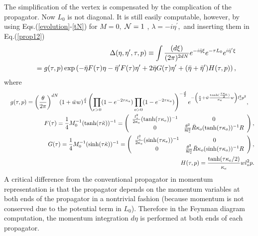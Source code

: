 \documentclass[a4paper,11pt]{article}
\begin{document}
The simplification of the vertex is compensated by the complication of the
propagator. Now $L_{0}$ is not diagonal. It is still easily computable,
however, by using Eqs.(\ref{evolution}-\ref{tN}) for $M=0,$ ${\cal N}=1$ , $\lambda
=-i\eta ^{\prime },$ and inserting them in Eq.(\ref{prop12})
\begin{eqnarray}
&&\Delta (\eta ,\eta ^{\prime },\tau ,p)\equiv \int \frac{(d\xi )}{(2\pi
)^{2dN}}e^{-i\bar{\eta}\xi }e^{-\tau L_{0}}e^{i\bar{\eta}^{\prime }\xi }
\label{propagator} \\
&&\quad =g(\tau ,p)\exp \left( -\bar{\eta}F(\tau )\eta -\bar{\eta}^{\prime
}F(\tau )\eta ^{\prime }+2\bar{\eta}G(\tau )\eta ^{\prime }+(\bar{\eta}+\bar{%
\eta}^{\prime })H(\tau ,p)\right) ,
\end{eqnarray}%
where%
\begin{eqnarray}
&&g(\tau ,p)=\left( \frac{\theta }{2\pi }\right) ^{dN}(1+\bar{w}w)^{\frac{d}{%
4}}\left( \prod_{e>0}(1-e^{-2\tau \kappa _{e}})\prod_{o>0}(1-e^{-2\tau
\kappa _{o}})\right) ^{-\frac{d}{2}}e^{-\left( {\frac{\tau }{2}}+\bar{w}{%
\frac{\tanh (\frac{\tau \kappa _{e}}{2})}{\kappa _{e}}}w\right)
l_{s}^{2}p^{2}},\quad  \\
&&F(\tau )={1\over 4}M_0^{-1}(\tanh(\tau\tilde{\kappa}))^{-1}
=\left(
\begin{array}{cc}
{\frac{l_{s}^{2}}{2\kappa _{e}}}(\tanh (\tau \kappa _{e}))^{-1} & 0 \\
0 & \frac{\theta ^{2}}{8l_{s}^{2}}\bar{R}\kappa _{o}(\tanh (\tau \kappa
_{o}))^{-1}R%
\end{array}%
\right) , \\
&&G(\tau )={1\over 4}M_0^{-1}(\sinh(\tau\tilde{\kappa}))^{-1}
=\left(
\begin{array}{cc}
{\frac{l_{s}^{2}}{2\kappa _{e}}}(\sinh (\tau \kappa _{e}))^{-1} & 0 \\
0 & \frac{\theta ^{2}}{8l_{s}^{2}}\bar{R}\kappa _{o}(\sinh (\tau \kappa
_{o}))^{-1}R%
\end{array}%
\right) , \\
&&H(\tau ,p)=\frac{\tanh (\tau \kappa _{e}/2)}{\kappa _{e}}wl_{s}^{2}p.
\end{eqnarray}%
A critical difference from the conventional propagator in momentum
representation is that the propagator depends on the momentum variables at
both ends of the propagator in a nontrivial fashion (because momentum is not
conserved due to the potential term in $L_{0}$). Therefore in the Feynman
diagram computation, the momentum integration $d\eta $ is performed at both
ends of each propagator.
\end{document}

